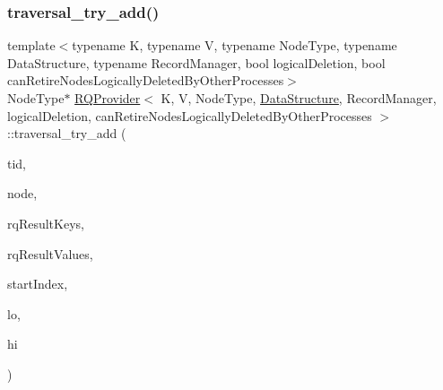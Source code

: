 \subsubsection{\texorpdfstring{traversal\+\_\+try\+\_\+add()}{traversal\_try\_add()}\hspace{0.1cm}{\footnotesize\ttfamily [2/5]}}
{\footnotesize\ttfamily template$<$typename K, typename V, typename Node\+Type, typename Data\+Structure, typename Record\+Manager, bool logical\+Deletion, bool can\+Retire\+Nodes\+Logically\+Deleted\+By\+Other\+Processes$>$ \\
Node\+Type$\ast$ \hyperlink{classRQProvider}{R\+Q\+Provider}$<$ K, V, Node\+Type, \hyperlink{classDataStructure}{Data\+Structure}, Record\+Manager, logical\+Deletion, can\+Retire\+Nodes\+Logically\+Deleted\+By\+Other\+Processes $>$\+::traversal\+\_\+try\+\_\+add (\begin{DoxyParamCaption}\item[{const int}]{tid,  }\item[{Node\+Type $\ast$const}]{node,  }\item[{K $\ast$const}]{rq\+Result\+Keys,  }\item[{V $\ast$const}]{rq\+Result\+Values,  }\item[{int $\ast$const}]{start\+Index,  }\item[{const K \&}]{lo,  }\item[{const K \&}]{hi }\end{DoxyParamCaption})\hspace{0.3cm}{\ttfamily [inline]}}

\mbox{\label{classRQProvider_ae67024f11a58a4a3e4a6cb86b7ed8292}} 
